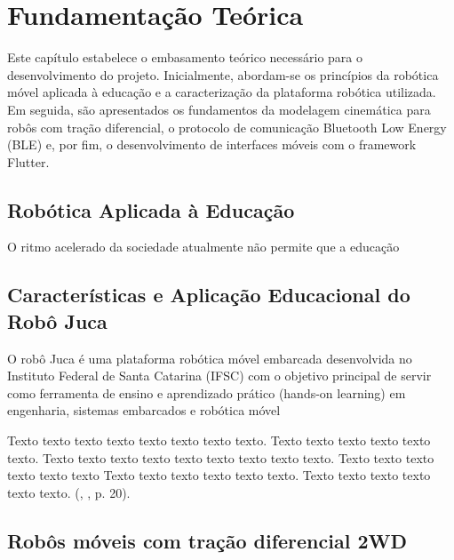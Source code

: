 \chapter{Fundamentação Teórica}
\label{cap:fundamentacao}

Este capítulo estabelece o embasamento teórico necessário para o desenvolvimento do projeto. Inicialmente, abordam-se os princípios da robótica móvel aplicada à educação e a caracterização da plataforma robótica utilizada. Em seguida, são apresentados os fundamentos da modelagem cinemática para robôs com tração diferencial, o protocolo de comunicação Bluetooth Low Energy (BLE) e, por fim, o desenvolvimento de interfaces móveis com o framework Flutter.

\section{Robótica Aplicada à Educação}
\label{sec:robotica-educacao}

O ritmo acelerado da sociedade atualmente não permite que a educação


\section{Características e Aplicação Educacional do Robô Juca}
\label{sec:plataforma-juca}

O robô Juca é uma plataforma robótica móvel embarcada desenvolvida no Instituto Federal de Santa Catarina (IFSC) com o objetivo principal de servir como ferramenta de ensino e aprendizado prático (hands-on learning) em engenharia, sistemas embarcados e robótica móvel


 \begin{citacao}
            \begin{alineas}[leftmargin=\leftskip+\labelwidth-\labelsep]
                Texto texto texto texto texto texto texto texto. Texto texto texto texto texto texto. Texto texto texto texto texto texto texto texto texto. Texto texto texto texto texto texto Texto texto texto texto texto texto. Texto texto texto texto texto texto. (\citeauthor{ref:ibmm}, \citeyear{ref:ibmm}, p. 20).
            \end{alineas}
\end{citacao}

\section{Robôs móveis com tração diferencial 2WD}
\label{sec:tracao-diferencial}

